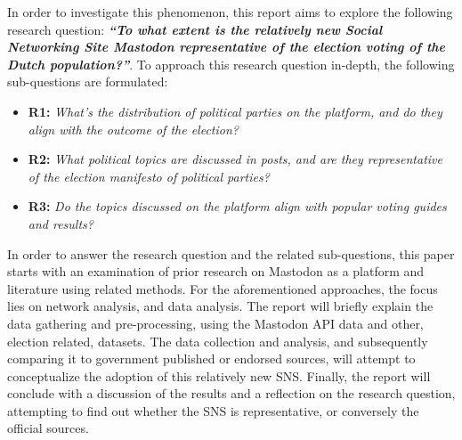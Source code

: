 In order to investigate this phenomenon, this report aims to explore the following research question:
\textbf{\textit{“To what extent is the relatively new Social Networking Site Mastodon representative of the election voting  of the Dutch population?”}}.
To approach this research question in-depth, the following sub-questions are formulated:
\begin{itemize}
  \item \textbf{R1:} \textit{What's the distribution of political parties on the platform, and do they align with the outcome of the election? }
  \item \textbf{R2:} \textit{What political topics are discussed in posts, and are they representative of the election manifesto of political parties? }
  \item \textbf{R3:} \textit{Do the topics discussed on the platform align with popular voting guides and results?}
\end{itemize}

In order to answer the research question and the related sub-questions, this paper starts with an examination of prior research on Mastodon as a platform and literature using related methods.
For the aforementioned approaches, the focus lies on network analysis, and data analysis.
The report will briefly explain the data gathering and pre-processing, using the Mastodon API data and other, election related, datasets.
The data collection and analysis, and subsequently comparing it to government published or endorsed sources, will attempt to conceptualize the adoption of this relatively new SNS.
Finally, the report will conclude with a discussion of the results and a reflection on the research question, attempting to find out whether the SNS is representative, or conversely the official sources.